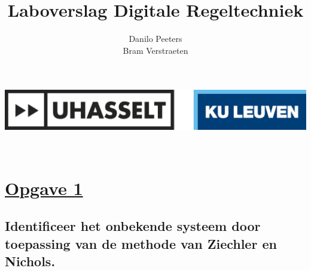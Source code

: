 \documentclass[a4paper, 12pt]{article}
\title{Laboverslag Digitale Regeltechniek}
\author{Danilo Peeters \\ Bram Verstraeten}
\begin{document}
\makeatletter
    \begin{titlepage}
	    \includegraphics[width=1\linewidth]{Logo_Uhasselt_KULeuven.jpeg}\\[30ex]
        \begin{center}
            {\huge \@title }\\[20ex] 
            {\large\@author}
        \end{center}
    \end{titlepage}
\makeatother

\newpage

\section{\underline{Opgave 1}}

\subsection{Identificeer het onbekende systeem door toepassing van de methode van Ziechler en Nichols.}

\begin{table}[!h]
\begin{large}
\centering
{}
\end{large}
\end{table}
\end{document}
